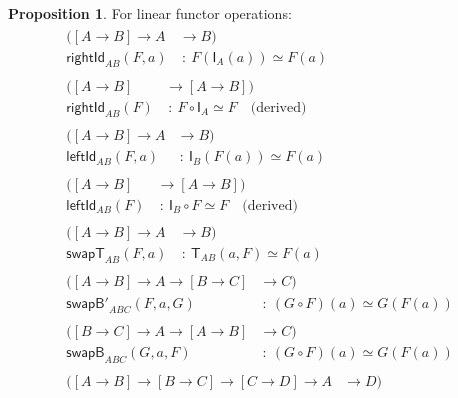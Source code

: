 \documentclass[a4paper]{article}
\theoremstyle{definition}
\newtheorem{proposition}[definition]{Proposition}
\theoremstyle{remark}
\renewcommand{\equiv}{\simeq}
\newcommand{\nm}{\mathsf}
\newcommand{\combinator}{\nm}
\newcommand{\idFun}{\combinator{I}}
\newcommand{\revAppFun}{\combinator{T}}
\begin{document}
\begin{proposition}
  For linear functor operations:
  \begin{gather*}
    \begin{aligned}
                      ([A \to B] \to A &\to   B)\\
      \nm{rightId}_{AB}(F,a)           &\ :\  F(\idFun_A(a)) \equiv F(a)
    \end{aligned}\\[1ex]
    \begin{aligned}
                      ([A \to B] &\to   [A \to B])\\
      \nm{rightId}_{AB}(F)       &\ :\  F \circ \idFun_A \equiv F
      \quad\text{(derived)}
    \end{aligned}\\[1ex]
    \begin{aligned}
                     ([A \to B] \to A &\to   B)\\
      \nm{leftId}_{AB}(F,a)           &\ :\  \idFun_B(F(a)) \equiv F(a)
    \end{aligned}\\[1ex]
    \begin{aligned}
                     ([A \to B] &\to   [A \to B])\\
      \nm{leftId}_{AB}(F)       &\ :\  \idFun_B \circ F \equiv F
      \quad\text{(derived)}
    \end{aligned}\\[1ex]
    \begin{aligned}
                    ([A \to B] \to A &\to   B)\\
      \nm{swapT}_{AB}(F,a)           &\ :\  \revAppFun_{AB}(a,F) \equiv F(a)
    \end{aligned}\\[1ex]
    \begin{aligned}
                      ([A \to B] \to A \to [B \to C] &\to   C)\\
      \nm{swapB'}_{ABC}(F,a,G)                       &\ :\  (G \circ F)(a) \equiv G(F(a))
    \end{aligned}\\[1ex]
    \begin{aligned}
                     ([B \to C] \to A \to [A \to B] &\to   C)\\
      \nm{swapB}_{ABC}(G,a,F)                       &\ :\  (G \circ F)(a) \equiv G(F(a))
    \end{aligned}\\[1ex]
    \begin{aligned}
                      ([A \to B] \to [B \to C] \to [C \to D] \to A &\to   D)\\

\end{aligned}
\end{gather*}
\end{proposition}
\end{document}
